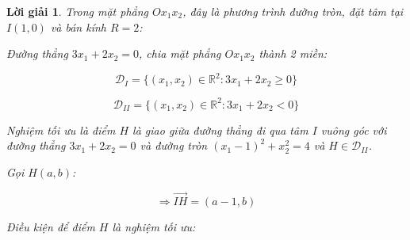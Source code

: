 \documentclass[14pt, a4paper]{article}
\theoremstyle{sltheorem}
\theoremstyle{soltheorem}
\newtheorem*{loigiai}{Lời giải}
\begin{document}
\begin{loigiai}
        Trong mặt phẳng $Ox_1 x_2$, đây là phương trình đường tròn, đặt tâm tại $I(1, 0)$ và bán kính $R=2$:

        Đường thẳng $3x_1 + 2x_2 = 0$, chia mặt phẳng $O x_1 x_2$ thành 2 miền:

        \begin{equation*}
            \mathcal{D}_I = \lbrace (x_1, x_2) \in \mathbb{R}^2: 3x_1 + 2x_2 \geq 0 \rbrace
        \end{equation*}

        \begin{equation*}
            \mathcal{D}_{II} = \lbrace (x_1, x_2) \in \mathbb{R}^2: 3x_1 + 2x_2 < 0 \rbrace
        \end{equation*}

        Nghiệm tối ưu là điểm $H$ là giao giữa đường thẳng đi qua tâm $I$ vuông góc với đường thẳng $3x_1 + 2x_2 = 0$ và đường tròn $(x_1 - 1)^2 + x_2^2 = 4$ và $H \in \mathcal{D}_{II}$.

        Gọi $H(a, b)$:

        \begin{equation*}
            \Rightarrow \overrightarrow{IH}=(a - 1, b)
        \end{equation*}

        Điều kiện để điểm $H$ là nghiệm tối ưu:


\end{loigiai}
\end{document}
